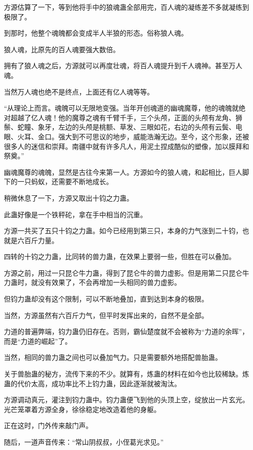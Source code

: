 \begin{this_body}
方源估算了一下，等到他将手中的狼魂蛊全部用完，百人魂的凝练差不多就凝练到极限了。

到那时，他整个魂魄都会变成半人半狼的形态。俗称狼人魂。

狼人魂，比原先的百人魂要强大数倍。

拥有了狼人魂之后，方源就可以再度壮魂，将百人魂提升到千人魂神。甚至万人魂。

当然万人魂也绝不是终点，上面还有亿人魂等等。

“从理论上而言。魂魄可以无限地变强。当年开创魂道的幽魂魔尊，他的魂魄就绝对超越了亿人魂！他的魔尊之魂有千臂千手，三个头颅，正面的头颅有龙角、狮鬃、蛇瞳、象牙，左边的头颅是桃额、草发、三眼如花，右边的头颅有云鬓、电眼、火耳、金口。强大到不可思议的地步，威能浩瀚无边。至今，这个形象，还被很多人的迷信和崇拜。南疆中就有许多凡人，用泥土捏成酷似的塑像，加以膜拜和祭奠。”

幽魂魔尊的魂魄，显然是古往今来第一人。方源如今的狼人魂，和起相比，巨人脚下的一只蚂蚁，还需要不断地成长。

稍微休息了一下，方源又取出十钧之力蛊。

此蛊好像是一个铁秤砣，拿在手中相当的沉重。

方源一共买了五只十钧之力蛊。如今已经用到第三只，本身的力气涨到二十钧，也就是六百斤力量。

四转的十钧之力蛊，比同转的兽力蛊，在效果上要弱一些，但胜在可以叠加。

方源之前，用过一只昆仑牛力蛊，得到了昆仑牛的兽力虚影。但是用第二只昆仑牛力蛊时，就没有效果了，不会再增加一头相同的兽力虚影。

但钧力蛊却没有这个限制，可以不断地叠加，直到达到本身的极限。

当然，方源虽然有六百斤力气，但平时发挥出来的，自然不是全部。

力道的普遍弊端，钧力蛊仍旧存在。否则，霸仙楚度就不会被称为“力道的余晖”，而是“力道的崛起”了。

当然，相同的兽力蛊之间也可以叠加气力。只是需要额外地搭配兽胎蛊。

关于兽胎蛊的秘方，流传下来的不少。就算有，炼蛊的材料在如今也比较稀缺。炼蛊的代价太高，成功率比不上钧力蛊，因此逐渐就被淘汰。

方源调动真元，灌注到钧力蛊中。钧力蛊便飞到他的头顶上空，绽放出一片玄光。光芒笼罩着方源全身，徐徐稳定地改造着他的身躯。

正在这时，门外传来敲门声。

随后，一道声音传来：“常山阴叔叔，小侄葛光求见。”


\end{this_body}
